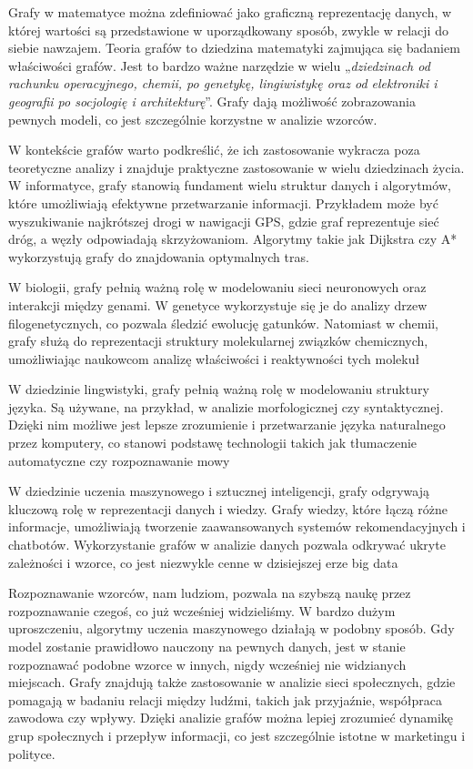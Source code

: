 Grafy w matematyce można zdefiniować jako graficzną reprezentację danych,
w której wartości są przedstawione w uporządkowany sposób,
zwykle w relacji do siebie nawzajem.
Teoria grafów to dziedzina matematyki zajmująca się badaniem właściwości grafów.
Jest to bardzo ważne narzędzie w wielu „\textit{dziedzinach od rachunku operacyjnego, chemii, po genetykę, lingiwistykę
oraz od elektroniki i geografii po socjologię i architekturę}”\cite{Wilson2012}.
Grafy dają możliwość zobrazowania pewnych modeli, co jest szczególnie korzystne w analizie wzorców.

W kontekście grafów warto podkreślić, że ich zastosowanie wykracza poza teoretyczne analizy
i znajduje praktyczne zastosowanie w wielu dziedzinach życia.
W informatyce, grafy stanowią fundament wielu struktur danych i algorytmów, które umożliwiają efektywne przetwarzanie informacji.
Przykładem może być wyszukiwanie najkrótszej drogi w nawigacji GPS, gdzie graf reprezentuje sieć dróg,
a węzły odpowiadają skrzyżowaniom. Algorytmy takie jak Dijkstra czy A* wykorzystują grafy do znajdowania optymalnych tras.

W biologii, grafy pełnią ważną rolę w modelowaniu sieci neuronowych oraz interakcji między genami.
W genetyce wykorzystuje się je do analizy drzew filogenetycznych, co pozwala śledzić ewolucję gatunków.
Natomiast w chemii, grafy służą do reprezentacji struktury molekularnej związków chemicznych,
umożliwiając naukowcom analizę właściwości i reaktywności tych molekuł

W dziedzinie lingwistyki, grafy pełnią ważną rolę w modelowaniu struktury języka.
Są używane, na przykład, w analizie morfologicznej czy syntaktycznej.
Dzięki nim możliwe jest lepsze zrozumienie i przetwarzanie języka naturalnego przez komputery,
co stanowi podstawę technologii takich jak tłumaczenie automatyczne czy rozpoznawanie mowy

W dziedzinie uczenia maszynowego i sztucznej inteligencji, grafy odgrywają kluczową rolę w reprezentacji danych i wiedzy.
Grafy wiedzy, które łączą różne informacje, umożliwiają tworzenie zaawansowanych systemów rekomendacyjnych i chatbotów.
Wykorzystanie grafów w analizie danych pozwala odkrywać ukryte zależności i wzorce, co jest niezwykle cenne w dzisiejszej erze big data

Rozpoznawanie wzorców, nam ludziom, pozwala na szybszą naukę przez rozpoznawanie czegoś, co już wcześniej widzieliśmy.
W bardzo dużym uproszczeniu, algorytmy uczenia maszynowego działają w podobny sposób.
Gdy model zostanie prawidłowo nauczony na pewnych danych, jest w stanie rozpoznawać podobne wzorce w innych,
nigdy wcześniej nie widzianych miejscach.
Grafy znajdują także zastosowanie w analizie sieci społecznych, gdzie pomagają w badaniu relacji między ludźmi,
takich jak przyjaźnie, współpraca zawodowa czy wpływy.
Dzięki analizie grafów można lepiej zrozumieć dynamikę grup społecznych i przepływ informacji,
co jest szczególnie istotne w marketingu i polityce.

